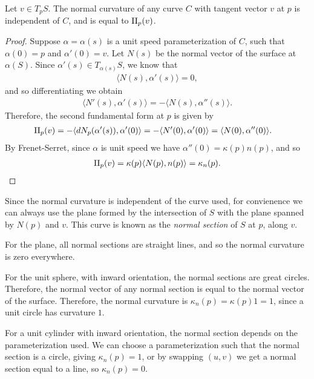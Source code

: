 \begin{prop}
    Let $v \in T_pS$. The normal curvature of any curve $C$ with tangent vector $v$ at $p$ is independent of $C$, and is equal to $\operatorname{II}_p(v)$.
\end{prop}

\begin{proof}
    Suppose $\alpha = \alpha(s)$ is a unit speed parameterization of $C$, such that $\alpha(0) = p$ and $\alpha'(0) = v$. Let $N(s)$ be the normal vector of the surface at $\alpha(S)$. Since $\alpha'(s) \in T_{\alpha(s)}S$, we know that
    \begin{align*}
        \langle N(s), \alpha'(s)\rangle = 0,
    \end{align*}
    and so differentiating we obtain
    \begin{align*}
        \langle N'(s), \alpha'(s)\rangle = -\langle N(s), \alpha''(s)\rangle.
    \end{align*}
    Therefore, the second fundamental form at $p$ is given by
    \begin{align*}
        \operatorname{II}_{p}(v) &= -\langle dN_p(\alpha'(s)), \alpha'(0)\rangle = -\langle N'(0), \alpha'(0)\rangle = \langle N(0), \alpha''(0)\rangle.
    \end{align*}
    By Frenet-Serret, since $\alpha$ is unit speed we have $\alpha''(0) = \kappa(p)n(p)$, and so
    \begin{align*}
        \operatorname{II}_p(v) = \kappa(p)\langle N(p), n(p)\rangle = \kappa_n(p).
    \end{align*}
\end{proof}

\begin{rmk}
    Since the normal curvature is independent of the curve used, for convienence we can always use the plane formed by the intersection of $S$ with the plane spanned by $N(p)$ and $v$. This curve is known as the \emph{normal section} of $S$ at $p$, along $v$.
\end{rmk}

\begin{exmp}
    For the plane, all normal sections are straight lines, and so the normal curvature is zero everywhere.

    For the unit sphere, with inward orientation, the normal sections are great circles. Therefore, the normal vector of any normal section is equal to the normal vector of the surface. Therefore, the normal curvature is $\kappa_n(p) = \kappa(p)1 = 1$, since a unit circle has curvature $1$.

    For a unit cylinder with inward orientation, the normal section depends on the parameterization used. We can choose a parameterization such that the normal section is a circle, giving $\kappa_n(p) = 1$, or by swapping $(u, v)$ we get a normal section equal to a line, so $\kappa_n(p) = 0$.
\end{exmp}

